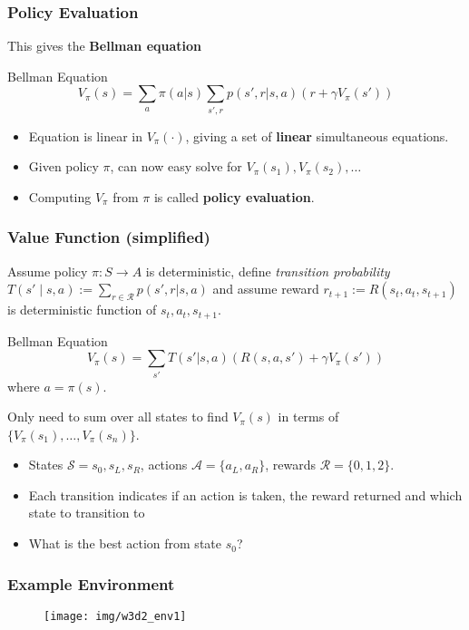 \documentclass[10pt,a4paper]{beamer}
\renewcommand{\S}{\mathcal{S}}
\newcommand{\A}{\mathcal{A}}
\newcommand{\R}{\mathcal{R}}
\begin{document}
\begin{frame}
	\frametitle{Policy Evaluation}
	This gives the \textbf{Bellman equation}
	\begin{block}{Bellman Equation}
		$$
		V_\pi(s) = \sum_{a} \pi(a | s) \sum_{s', r} p(s', r | s, a) \left( r + \gamma V_\pi(s') \right) 
		$$
	\end{block}

\begin{itemize}
	\pause
\item Equation is linear in $V_{\pi}(\cdot)$, 
giving a set of \textbf{linear} simultaneous equations.
\pause
\item Given policy $\pi$, can now easy solve for $V_{\pi}(s_1), V_{\pi}(s_2), \ldots$
\pause
\item Computing $V_\pi$ from $\pi$ is called \textbf{policy evaluation}.
\end{itemize}
\end{frame}

\begin{frame}
\frametitle{Value Function (simplified)}
Assume policy $\pi : S \to A$ is deterministic, define
\textit{transition probability} $T(s' \mid s, a) := \sum_{r \in \R} p(s',r | s, a)$
and assume reward $r_{t+1} := R(s_t, a_t, s_{t+1})$ 
is deterministic function of $s_t, a_t, s_{t+1}$.
\begin{block}{Bellman Equation}
	$$
	V_\pi(s) = \sum_{s'} T(s' | s, a) \left( R(s,a,s') + \gamma V_\pi(s') \right) 
	$$
	where $a = \pi(s)$.
\end{block}
\pause
Only need to sum over all states to find $V_\pi(s)$ in terms of
$\{V_\pi(s_1), \ldots, V_\pi(s_n)\}$. 
\end{frame}



\begin{frame}
	\begin{itemize}
		\item States $\S = {s_0, s_L,s_R}$, actions $\A = \{a_L, a_R\}$,
		rewards $\R= \{0,1,2\}$.
		\item Each transition indicates if an action is taken, the reward returned
		and which state to transition to
		\item What is the best action from state $s_0$?
	\end{itemize}
	\frametitle{Example Environment}
	\begin{figure}
		\centering
		\texttt{[image: img/w3d2\_env1]}
		\label{fig:w3d2env1}
	\end{figure}
\end{frame}
\end{document}
